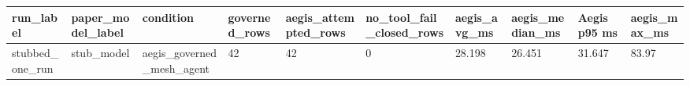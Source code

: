 \begin{tabular}{llllllllll}
 \hline
run\_label & paper\_model\_label & condition & governed\_rows & aegis\_attempted\_rows & no\_tool\_fail\_closed\_rows & aegis\_avg\_ms & aegis\_median\_ms & Aegis p95 ms & aegis\_max\_ms \\
 \hline
stubbed\_one\_run & stub\_model & aegis\_governed\_mesh\_agent & 42 & 42 & 0 & 28.198 & 26.451 & 31.647 & 83.97 \\
 \hline
\end{tabular}
